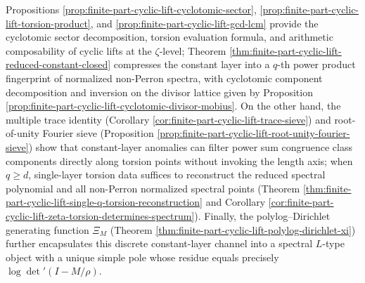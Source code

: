 \begin{remark}\label{rem:finite-part-cyclic-lift-spectral-microscope}
Propositions \ref{prop:finite-part-cyclic-lift-cyclotomic-sector}, \ref{prop:finite-part-cyclic-lift-torsion-product}, and \ref{prop:finite-part-cyclic-lift-gcd-lcm} provide the cyclotomic sector decomposition, torsion evaluation formula, and arithmetic composability of cyclic lifts at the \(\zeta\)-level;
Theorem \ref{thm:finite-part-cyclic-lift-reduced-constant-closed} compresses the constant layer into a \(q\)-th power product fingerprint of normalized non-Perron spectra, with cyclotomic component decomposition and inversion on the divisor lattice given by Proposition \ref{prop:finite-part-cyclic-lift-cyclotomic-divisor-mobius}.
On the other hand, the multiple trace identity (Corollary \ref{cor:finite-part-cyclic-lift-trace-sieve}) and root-of-unity Fourier sieve (Proposition \ref{prop:finite-part-cyclic-lift-root-unity-fourier-sieve}) show that constant-layer anomalies can filter power sum congruence class components directly along torsion points without invoking the length axis; when \(q\ge d\), single-layer torsion data suffices to reconstruct the reduced spectral polynomial and all non-Perron normalized spectral points (Theorem \ref{thm:finite-part-cyclic-lift-single-q-torsion-reconstruction} and Corollary \ref{cor:finite-part-cyclic-lift-zeta-torsion-determines-spectrum}).
Finally, the polylog--Dirichlet generating function \(\Xi_M\) (Theorem \ref{thm:finite-part-cyclic-lift-polylog-dirichlet-xi}) further encapsulates this discrete constant-layer channel into a spectral \(L\)-type object with a unique simple pole whose residue equals precisely \(\log\det\nolimits'(I-M/\rho)\).
\end{remark}
